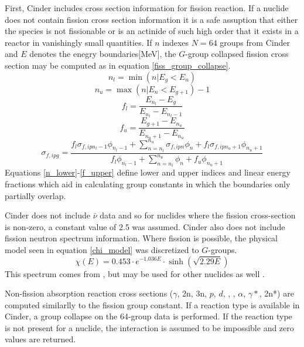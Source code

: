 First, Cinder includes cross section information for fission reaction.  If a nuclide does not 
contain fission cross section information it is a safe assuption that either the species 
is not fissionable or is an actinide of such high order that it exists in a reactor in vanishingly 
small quantities.  If $n$ indexes $N=64$ groups from Cinder and $E$ denotes the enegry boundaries[MeV], 
the $G$-group collapsed fission cross section may be computed as in equation \ref{fiss_group_collapse}.
\begin{equation}
\label{n_lower}
n_l = \min(n|E_g<E_n)
\end{equation}
\begin{equation}
\label{n_upper}
n_u = \max(n|E_n<E_{g+1}) - 1
\end{equation}
\begin{equation}
\label{f_lower}
f_l = \frac{E_{n_l} - E_g}{E_{n_l} - E_{n_l-1}}
\end{equation}
\begin{equation}    
\label{f_upper}
f_u = \frac{E_{g+1} - E_{n_u}}{E_{n_u+1} - E_{n_u}}
\end{equation}
\begin{equation}
\label{fiss_group_collapse}
\sigma_{f,ipg} = \frac{f_l\sigma_{f,ipn_l-1}\phi_{n_l-1} + \sum_{n=n_l}^{n_u} \sigma_{f,ipn}\phi_n + f_l\sigma_{f,ipn_u+1}\phi_{n_u+1}}{f_l\phi_{n_l-1} + \sum_{n=n_l}^{n_u} \phi_n  + f_u\phi_{n_u+1}}
\end{equation}
Equations \ref{n_lower}-\ref{f_upper} define lower and upper indices and linear energy fractions
which aid in calculating group constants in which the boundaries only partially overlap.

Cinder does not include $\bar{\nu}$ data and so for nuclides where the fission cross-section is 
non-zero, a constant value of 2.5 was assumed. Cinder also does not include fission neutron 
spectrum information.  Where fission is possible, the physical model seen in equation \ref{chi_model}
was discretized to $G$-groups.
\begin{equation}
\label{chi_model}
\chi(E) = 0.453 \cdot e^{-1.036E} \cdot \sinh\left(\sqrt{2.29E}\right)
\end{equation}
This spectrum comes from , but may be used for other nuclides as well \cite{Lamarsh2002}.

Non-fission absorption reaction cross sections ($\gamma$, 2n, 3n, $p$, $d$, , , 
$\alpha$, $\gamma*$, 2n*) are computed similarlly to the fission group constant.  If a reaction 
type is available in Cinder, a group collapse on the 64-group data is performed.  If the reaction 
type is not present for a nuclide, the interaction is assumed to be impossible and zero values
are returned.

